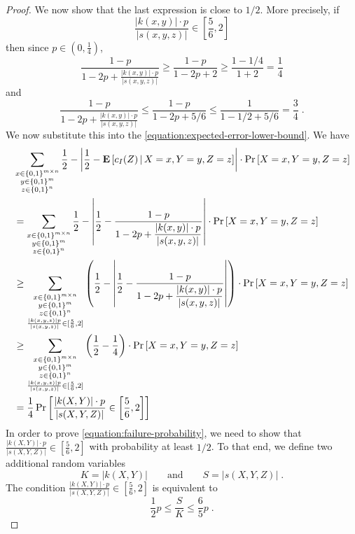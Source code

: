 \begin{proof}
We now show that the last expression is close to $1/2$. More precisely, if
\begin{equation}
\frac{|k(x,y)| \cdot p}{|s(x,y,z)|} \in \left[\frac{5}{6}, 2 \right]
\end{equation}
then since $p \in (0,\frac{1}{4})$,
$$
\frac{\displaystyle 1 - p}{\displaystyle 1 - 2p + \frac{|k(x,y)| \cdot p}{|s(x,y,z)|}} \ge
\frac{\displaystyle 1 - p}{\displaystyle 1 - 2p + 2} \ge \frac{\displaystyle 1 - 1/4}{\displaystyle 1 + 2} = \frac{1}{4}
$$
and
$$
\frac{\displaystyle 1 - p}{\displaystyle 1 - 2p + \frac{|k(x,y)| \cdot p}{|s(x,y,z)|}} \le
\frac{\displaystyle 1 - p}{\displaystyle 1 - 2p + 5/6} \le \frac{\displaystyle 1}{\displaystyle 1 - 1/2 + 5/6} = \frac{3}{4} \; .
$$
We now substitute this into the \eqref{equation:expected-error-lower-bound}. We have
\begin{align*}
& \sum_{\substack{x \in \{0,1\}^{m \times n} \\ y \in \{0,1\}^m \\ z \in \{0,1\}^n}} \frac{1}{2} - \left| \frac{1}{2} - \operatorname{\mathbf{E}}\left[ c_I(Z) \, \middle| \, X = x, Y = y, Z = z \right] \right| \cdot \Pr \left[X = x, Y = y, Z = z \right] \\
& = \sum_{\substack{x \in \{0,1\}^{m \times n} \\ y \in \{0,1\}^m \\ z \in \{0,1\}^n}} \frac{1}{2} - \left| \frac{1}{2} - \frac{\displaystyle 1 - p}{\displaystyle 1 - 2p + \frac{|k(x,y)| \cdot p}{|s(x,y,z)|}} \right| \cdot \Pr \left[X = x, Y = y, Z = z \right] \\
& \ge
\sum_{\substack{x \in \{0,1\}^{m \times n} \\ y \in \{0,1\}^m \\ z \in \{0,1\}^n \\ \frac{|k(x,y,z)| p}{|s(x,y,z)|} \in [\frac{5}{6},2]}} \left( \frac{1}{2} - \left| \frac{1}{2} - \frac{\displaystyle 1 - p}{\displaystyle 1 - 2p + \frac{|k(x,y)| \cdot p}{|s(x,y,z)|}} \right|  \right) \cdot \Pr \left[X = x, Y = y, Z = z \right] \\
& \ge
\sum_{\substack{x \in \{0,1\}^{m \times n} \\ y \in \{0,1\}^m \\ z \in \{0,1\}^n \\ \frac{|k(x,y,z)| p}{|s(x,y,z)|} \in [\frac{5}{6},2]}} \left( \frac{1}{2} - \frac{1}{4} \right) \cdot \Pr \left[X = x, Y = y, Z = z \right] \\
& =
\frac{1}{4} \Pr \left[ \frac{|k(X,Y)| \cdot p}{|s(X,Y,Z)|} \in \left[\frac{5}{6}, 2 \right]  \right] \\
\end{align*}
In order to prove \eqref{equation:failure-probability}, we need to show that
$\frac{|k(X,Y)| \cdot p}{|s(X,Y,Z)|} \in \left[\frac{5}{6}, 2 \right]$ with
probability at least $1/2$. To that end, we define two additional random
variables
$$
K = |k(X,Y)| \qquad \text{and} \qquad S = |s(X,Y,Z)| \; .
$$
The condition $\frac{|k(X,Y)| \cdot p}{|s(X,Y,Z)|} \in \left[\frac{5}{6}, 2 \right]$ is equivalent to
\begin{equation}
\label{equation:ratio-condition}
\frac{1}{2} p \le \frac{S}{K} \le \frac{6}{5} p \; .
\end{equation}


\end{proof}
